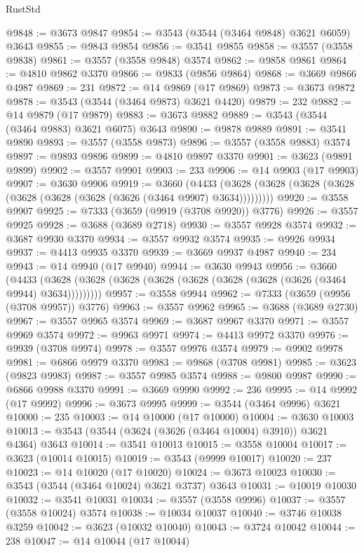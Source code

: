 \begin{lexlean}{RustStd}
\begin{coremodule}
@9848 := @3673 @9847
@9854 := @3543 (@3544 (@3464 @9848) @3621 @6059) @3643
@9855 := @9843 @9854
@9856 := @3541 @9855
@9858 := @3557 (@3558 @9838)
@9861 := @3557 (@3558 @9848) @3574
@9862 := @9858 @9861
@9864 := @4810 @9862 @3370
@9866 := @9833 (@9856 @9864)
@9868 := @3669 @9866 @4987
@9869 := 231
@9872 := @14 @9869 (@17 @9869)
@9873 := @3673 @9872
@9878 := @3543 (@3544 (@3464 @9873) @3621 @4420)
@9879 := 232
@9882 := @14 @9879 (@17 @9879)
@9883 := @3673 @9882
@9889 := @3543 (@3544 (@3464 @9883) @3621 @6075) @3643
@9890 := @9878 @9889
@9891 := @3541 @9890
@9893 := @3557 (@3558 @9873)
@9896 := @3557 (@3558 @9883) @3574
@9897 := @9893 @9896
@9899 := @4810 @9897 @3370
@9901 := @3623 (@9891 @9899)
@9902 := @3557 @9901
@9903 := 233
@9906 := @14 @9903 (@17 @9903)
@9907 := @3630 @9906
@9919 := @3660
    (@4433 (@3628 (@3628 (@3628 (@3628 (@3628 (@3628 (@3628 (@3626 (@3464 @9907) @3634)))))))))
@9920 := @3558 @9907
@9925 := @7333 (@3659 (@9919 (@3708 @9920)) @3776)
@9926 := @3557 @9925
@9928 := @3688 (@3689 @2718)
@9930 := @3557 @9928 @3574
@9932 := @3687 @9930 @3370
@9934 := @3557 @9932 @3574
@9935 := @9926 @9934
@9937 := @4413 @9935 @3370
@9939 := @3669 @9937 @4987
@9940 := 234
@9943 := @14 @9940 (@17 @9940)
@9944 := @3630 @9943
@9956 := @3660
    (@4433 (@3628 (@3628 (@3628 (@3628 (@3628 (@3628 (@3628 (@3626 (@3464 @9944) @3634)))))))))
@9957 := @3558 @9944
@9962 := @7333 (@3659 (@9956 (@3708 @9957)) @3776)
@9963 := @3557 @9962
@9965 := @3688 (@3689 @2730)
@9967 := @3557 @9965 @3574
@9969 := @3687 @9967 @3370
@9971 := @3557 @9969 @3574
@9972 := @9963 @9971
@9974 := @4413 @9972 @3370
@9976 := @9939 (@3708 @9974)
@9978 := @3557 @9976 @3574
@9979 := @9902 @9978
@9981 := @6866 @9979 @3370
@9983 := @9868 (@3708 @9981)
@9985 := @3623 (@9823 @9983)
@9987 := @3557 @9985 @3574
@9988 := @9800 @9987
@9990 := @6866 @9988 @3370
@9991 := @3669 @9990
@9992 := 236
@9995 := @14 @9992 (@17 @9992)
@9996 := @3673 @9995
@9999 := @3544 (@3464 @9996) @3621
@10000 := 235
@10003 := @14 @10000 (@17 @10000)
@10004 := @3630 @10003
@10013 := @3543 (@3544 (@3624 (@3626 (@3464 @10004) @3910)) @3621 @4364) @3643
@10014 := @3541 @10013
@10015 := @3558 @10004
@10017 := @3623 (@10014 @10015)
@10019 := @3543 (@9999 @10017)
@10020 := 237
@10023 := @14 @10020 (@17 @10020)
@10024 := @3673 @10023
@10030 := @3543 (@3544 (@3464 @10024) @3621 @3737) @3643
@10031 := @10019 @10030
@10032 := @3541 @10031
@10034 := @3557 (@3558 @9996)
@10037 := @3557 (@3558 @10024) @3574
@10038 := @10034 @10037
@10040 := @3746 @10038 @3259
@10042 := @3623 (@10032 @10040)
@10043 := @3724 @10042
@10044 := 238
@10047 := @14 @10044 (@17 @10044)

\end{coremodule}
\end{lexlean}
